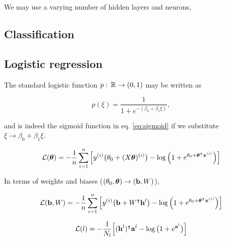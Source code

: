     We may use a varying number of hidden layers and neurons, 
    
    

\subsection{Classification}\label{sec:classification}

\subsection{Logistic regression}\label{sec:logistic_regression}

The standard logistic function $p:\, \mathbb{R}^{} \to (0,1)$ may be written as 

\begin{equation}\label{eq:logistic_function}
    p(\xi) = \frac{1}{1+e^{-(\beta_0 + \beta_1\xi)}},
\end{equation}

and is indeed the sigmoid function in eq. \eqref{eq:sigmoid} if we substitute $\xi \to \beta_0 + \beta_1 \xi$. 
\fillertext





\begin{equation}\label{eq:logistic_cost_function}
    \mathcal{L}(\boldsymbol{\theta}) = -  \frac{1}{n}\sum_{i=1}^n \Big[ y^{(i)} \big(\theta_0 + (X\boldsymbol{\theta})^{(i)}\big) - \log{\Big(1+e^{\theta_0 + \boldsymbol{\theta}^\intercal\mathbf{x}^{(i)}}\Big)} \Big]
\end{equation}

In terms of weights and biases ($ (\theta_0,  \boldsymbol{\theta} ) \to (\mathbf{b}, W)$),

\begin{equation}\label{eq:logistic_cost_function_NN}
    \mathcal{L}(\mathbf{b}, W) = -  \frac{1}{n}\sum_{i=1}^n \Big[ y^{(i)} \big(\mathbf{b} + W^\intercal \mathbf{h}^{l}\big) - \log{\Big(1+e^{\theta_0 + \boldsymbol{\theta}^\intercal\mathbf{x}^{(i)}}\Big)} \Big]
\end{equation}

\begin{equation}\label{eq:logistic_cost_function_NN2}
    \mathcal{L}(l) = -  \frac{1}{N_l} \Big[ (\mathbf{h}^{l})^\intercal\mathbf{a}^{l} - \log{\big(1+e^{\mathbf{a}^{l}}\big)} \Big]
\end{equation}
